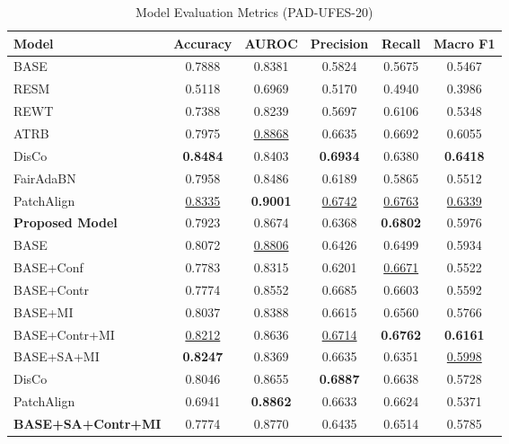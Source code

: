 \begin{table}[h]
\centering
\caption{Model Evaluation Metrics (PAD-UFES-20)}
\label{tab:cross_model_metrics}
\begin{tabular}{|l|c|c|c|c|c|}
\hline
Model & Accuracy & AUROC & Precision & Recall & Macro F1 \\
\hline
BASE & 0.7888 & 0.8381 & 0.5824 & 0.5675 & 0.5467 \\
RESM & 0.5118 & 0.6969 & 0.5170 & 0.4940 & 0.3986 \\
REWT & 0.7388 & 0.8239 & 0.5697 & 0.6106 & 0.5348 \\
ATRB & 0.7975 & \underline{0.8868} & 0.6635 & 0.6692 & 0.6055 \\
DisCo & \textbf{0.8484} & 0.8403 & \textbf{0.6934} & 0.6380 & \textbf{0.6418} \\
FairAdaBN & 0.7958 & 0.8486 & 0.6189 & 0.5865 & 0.5512 \\
PatchAlign & \underline{0.8335} & \textbf{0.9001} & \underline{0.6742} & \underline{0.6763} & \underline{0.6339} \\
\textbf{Proposed Model} & 0.7923 & 0.8674 & 0.6368 & \textbf{0.6802} & 0.5976 \\
\hline
BASE & 0.8072 & \underline{0.8806} & 0.6426 & 0.6499 & 0.5934 \\
BASE+Conf & 0.7783 & 0.8315 & 0.6201 & \underline{0.6671} & 0.5522 \\
BASE+Contr & 0.7774 & 0.8552 & 0.6685 & 0.6603 & 0.5592 \\
BASE+MI & 0.8037 & 0.8388 & 0.6615 & 0.6560 & 0.5766 \\
BASE+Contr+MI & \underline{0.8212} & 0.8636 & \underline{0.6714} & \textbf{0.6762} & \textbf{0.6161} \\
BASE+SA+MI & \textbf{0.8247} & 0.8369 & 0.6635 & 0.6351 & \underline{0.5998} \\
DisCo & 0.8046 & 0.8655 & \textbf{0.6887} & 0.6638 & 0.5728 \\
PatchAlign & 0.6941 & \textbf{0.8862} & 0.6633 & 0.6624 & 0.5371 \\
\textbf{BASE+SA+Contr+MI} & 0.7774 & 0.8770 & 0.6435 & 0.6514 & 0.5785 \\
\hline
\end{tabular}
\end{table}


